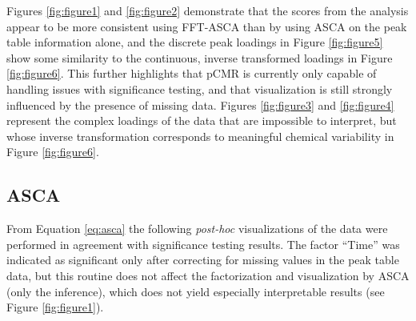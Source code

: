 \documentclass[preprint,12pt]{elsarticle}
\begin{document}
Figures \ref{fig:figure1} and \ref{fig:figure2} demonstrate that the scores from the analysis appear to be more consistent using FFT-ASCA than by using ASCA on the peak table information alone, and the discrete peak loadings in Figure \ref{fig:figure5} show some similarity to the continuous, inverse transformed loadings in Figure \ref{fig:figure6}. This further highlights that pCMR is currently only capable of handling issues with significance testing, and that visualization is still strongly influenced by the presence of missing data.  Figures \ref{fig:figure3} and \ref{fig:figure4} represent the complex loadings of the data that are impossible to interpret, but whose inverse transformation corresponds to meaningful chemical variability in Figure \ref{fig:figure6}.

\subsection{ASCA}

From Equation \ref{eq:asca} the following \textit{post-hoc} visualizations of the data were performed in agreement with significance testing results. The factor ``Time'' was indicated as significant only after correcting for missing values in the peak table data, but this routine does not affect the factorization and visualization by ASCA (only the inference), which does not yield especially interpretable results (see Figure \ref{fig:figure1}). 
\end{document}
